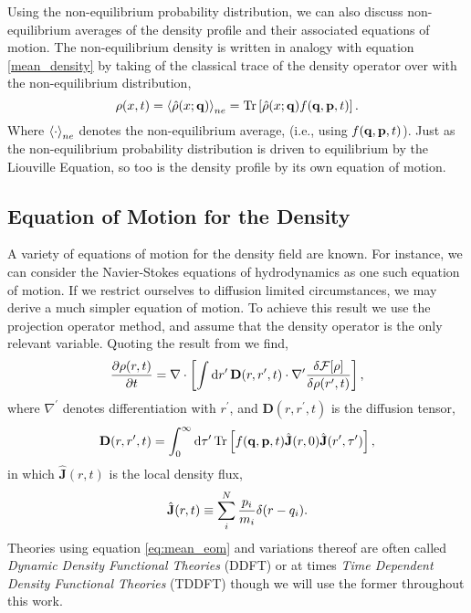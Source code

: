 Using the non-equilibrium probability distribution, we can also discuss
non-equilibrium averages of the density profile and their associated equations
of motion. The non-equilibrium density is written in analogy with equation
\ref{mean_density} by taking of the classical trace of the density operator
over with the non-equilibrium distribution,
%
\begin{equation}
    \rho(x, t) = \left\langle \hat{\rho}(x; \mathbf{q}) \right\rangle_{ne} =
        \mathrm{Tr}\left[ \hat{\rho}(x; \mathbf{q}) f(\mathbf{q}, \mathbf{p}, t) \right].
\end{equation}
%
Where $\left\langle \cdot \right\rangle_{ne}$ denotes the non-equilibrium average, (i.e., using
$f(\mathbf{q}, \mathbf{p},t)$). Just as the non-equilibrium probability distribution is driven
to equilibrium by the Liouville Equation, so too is the density profile by its
own equation of motion.

\subsection{Equation of Motion for the Density} %

A variety of equations of motion for the density field are known.  For
instance, we can consider the Navier-Stokes equations of hydrodynamics as one
such equation of motion. If we restrict ourselves to diffusion limited
circumstances, we may derive a much simpler equation of motion. To achieve
this result we use the projection operator method, and assume that the 
density operator is the only relevant variable. Quoting the result from
\cite{ESPANOL09} we find,
%
\begin{equation}
    \label{eq:mean_eom}
    \frac{\partial \rho(r, t)}{\partial t} = 
        \nabla \cdot \left[\int \mathrm{d}r^\prime\, \mathbf{D}(r, r^\prime, t) 
        \cdot \nabla^\prime \frac{\delta \mathcal{F}[\rho]}{\delta \rho(r^\prime, t)}\right],
\end{equation}
%
where $\nabla^\prime$ denotes differentiation with $r^\prime$, and $\mathbf{D}(r, r^\prime, t)$ is the diffusion tensor,
%
\begin{equation}
    \mathbf{D}(r, r^\prime, t) = \int_0^\infty \mathrm{d}\tau^\prime\,
        \mathrm{Tr}\left[ f(\mathbf{q}, \mathbf{p}, t)\hat{\mathbf{J}}(r, 0)
        \hat{\mathbf{J}}(r^\prime, \tau^\prime) \right],
\end{equation}
%
in which $\hat{\mathbf{J}}(r, t)$ is the local density flux,
%
\begin{equation}
    \hat{\mathbf{J}}(r, t) \equiv 
        \sum_i^N \frac{p_i}{m_i} \delta(r - q_i).
\end{equation}
%
Theories using equation \ref{eq:mean_eom} and variations thereof are often
called \textit{Dynamic Density Functional Theories} (DDFT) or at times
\textit{Time Dependent Density Functional Theories} (TDDFT) though we will use
the former throughout this work.

